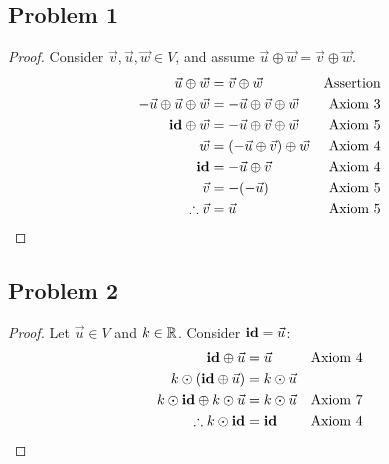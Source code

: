 




\subsection*{Problem 1}
\begin{proof}
  Consider $\vec{v}, \vec{u}, \vec{w} \in V$, and assume $\vec{u} \oplus \vec{w} = \vec{v} \oplus \vec{w}$.
  \begin{align*}
    \vec{u} \oplus \vec{w}                 & = \vec{v} \oplus \vec{w}                   & \text{Assertion} \\
    -\vec{u} \oplus \vec{u} \oplus \vec{w} & = -\vec{u} \oplus \vec{v} \oplus \vec{w}   & \text{Axiom 3}   \\
    \textbf{id} \oplus \vec{w}                & = -\vec{u} \oplus \vec{v} \oplus \vec{w}   & \text{Axiom 5}   \\
    \vec{w}                                & = (-\vec{u} \oplus \vec{v}) \oplus \vec{w} & \text{Axiom 4}   \\
    \textbf{id}                               & = -\vec{u} \oplus \vec{v}                  & \text{Axiom 4}   \\
    \vec{v}                                & = -(-\vec{u})                              & \text{Axiom 5}   \\
    \therefore \vec{v}                     & = \vec{u}                                  & \text{Axiom 5}
  \end{align*}
\end{proof}

\subsection*{Problem 2}
\begin{proof}
  Let $\vec{u} \in V$ and $k \in \mathbb{R}$. Consider $\textbf{id} = \vec{u}$:
  \begin{align*}
    \textbf{id} \oplus \vec{u}                 & = \vec{u}         & \text{Axiom 4} \\
    k \odot (\textbf{id} \oplus \vec{u})       & = k \odot \vec{u}                  \\
    k \odot \textbf{id} \oplus k \odot \vec{u} & = k \odot \vec{u} & \text{Axiom 7} \\
    \therefore k \odot \textbf{id}             & = \textbf{id}        & \text{Axiom 4}
  \end{align*}
\end{proof}

